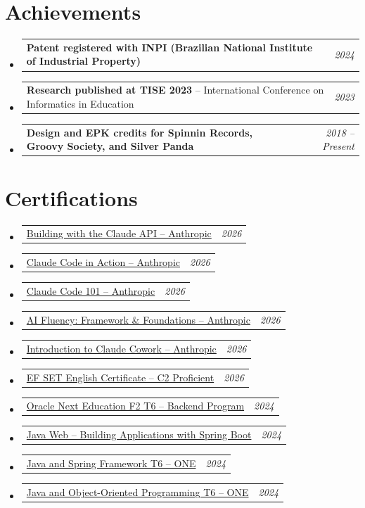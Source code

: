 \documentclass[a4paper,11pt]{article}
\makeatletter
\newcommand{\resumePOR}[3]{
\vspace{0.5mm}\item
    \begin{tabular*}{0.97\textwidth}[t]{l@{\extracolsep{\fill}}r}
        \textbf{#1}\hspace{0.3mm}#2 & \textit{\small{#3}}
    \end{tabular*}
    \vspace{-2mm}
}
\newcommand{\resumeSubHeadingListStart}{\begin{itemize}[leftmargin=*,labelsep=0mm]}
\newcommand{\resumeSubHeadingListEnd}{\end{itemize}\vspace{2mm}}
\makeatother
\begin{document}
\section{\textbf{Achievements}}
 \vspace{-0.4mm}
 \resumeSubHeadingListStart
 \resumePOR{Patent registered with INPI (Brazilian National Institute of Industrial Property)}{}{2024}
 \resumePOR{Research published at TISE 2023}{ -- International Conference on Informatics in Education}{2023}
 \resumePOR{Design and EPK credits for Spinnin Records, Groovy Society, and Silver Panda}{}{2018 -- Present}
 \resumeSubHeadingListEnd
 \vspace{-5mm}

\section{\textbf{Certifications}}
\vspace{-0.4mm}
\resumeSubHeadingListStart
    \resumePOR {}
        {\href{https://verify.skilljar.com/c/bfrsmrfj3bzt}{Building with the Claude API -- Anthropic}}
        {2026}
    \resumePOR {}
        {\href{https://verify.skilljar.com/c/xjs8afiak8vv}{Claude Code in Action -- Anthropic}}
        {2026}
    \resumePOR {}
        {\href{https://verify.skilljar.com/c/6jrkvs9p54u9}{Claude Code 101 -- Anthropic}}
        {2026}
    \resumePOR {}
        {\href{https://verify.skilljar.com/c/xeqrcwuynqib}{AI Fluency: Framework \& Foundations -- Anthropic}}
        {2026}
    \resumePOR {}
        {\href{https://verify.skilljar.com/c/s5nvotjcapt6}{Introduction to Claude Cowork -- Anthropic}}
        {2026}
    \resumePOR {}
        {\href{https://cert.efset.org/en/pFP3vr}{EF SET English Certificate -- C2 Proficient}}
        {2026}
    \resumePOR {}
        {\href{https://cursos.alura.com.br/program/certificate/3fcc6b19-b023-4a20-b202-ef4bcffd0591?lang}{Oracle Next Education F2 T6 -- Backend Program}}
        {2024}
    \resumePOR {}
        {\href{https://cursos.alura.com.br/user/eumoitinho/degree-java-web-spring-boot-596328/certificate}{Java Web -- Building Applications with Spring Boot}}
        {2024}
    \resumePOR {}
        {\href{https://cursos.alura.com.br/user/eumoitinho/degree-spring-framework-turma6-one-733547/certificate}{Java and Spring Framework T6 -- ONE}}
        {2024}
    \resumePOR {}
        {\href{https://cursos.alura.com.br/user/eumoitinho/degree-java-turma6-one-733558/certificate}{Java and Object-Oriented Programming T6 -- ONE}}
        {2024}
\resumeSubHeadingListEnd
\vspace{-5mm}
\end{document}
